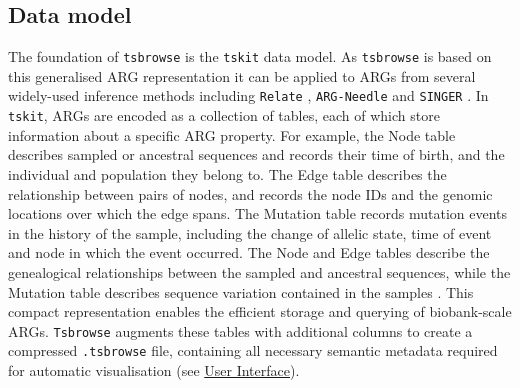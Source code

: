 \documentclass[unnumsec,webpdf,contemporary,large,namedate]{oup-authoring-template}%
\begin{document}
\subsection{Data model}
\label{subsec:Data_Model}
    The foundation of \texttt{tsbrowse} is the \texttt{tskit} data model. As \texttt{tsbrowse} is based on this generalised ARG representation \citep{Wong2024} it can be applied to ARGs from several widely-used inference methods including \texttt{Relate} \citep{Speidel2019}, \texttt{ARG-Needle} \citep{Zhang2023} and \texttt{SINGER} \citep{Deng2024.03.16.585351}. In \texttt{tskit}, ARGs are encoded as a collection of tables, each of which store information about a specific ARG property. For example, the Node table describes sampled or ancestral sequences and records their time of birth, and the individual and population they belong to. The Edge table describes the relationship between pairs of nodes, and records the node IDs and the genomic locations over which the edge spans. The Mutation table records mutation events in the history of the sample, including the change of allelic state, time of event and node in which the event occurred. The Node and Edge tables describe the genealogical relationships between the sampled and ancestral sequences, while the Mutation table describes sequence variation contained in the samples \citep{Ralph2020}. This compact representation enables the efficient storage and querying of biobank-scale ARGs. \texttt{Tsbrowse} augments these tables with additional columns to create a compressed \texttt{.tsbrowse} file, containing all necessary semantic metadata required for automatic visualisation (see \hyperref[subsec:User_Interface]{User Interface}). 
\end{document}
